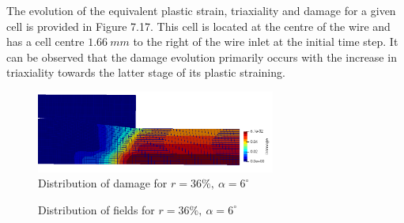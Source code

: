 \documentclass[sn-mathphys,Numbered,draft]{sn-jnl}%
\begin{document}
The evolution of the equivalent plastic strain, triaxiality and damage for a given cell is provided in Figure 7.17. This cell is located at the centre of the wire and has a cell centre $1.66\ mm$ to the right of the wire inlet at the initial time step. It can be observed that the damage evolution primarily occurs with the increase in triaxiality towards the latter stage of its plastic straining.

\begin{figure}[htb]
\begin{center}
	\includegraphics[width=0.7\textwidth]{./Figures/SimulationAndAnalysis/compare36_12/36_6Damage.png}
\caption{Distribution of damage for $r=36\%,\ \alpha=6^{\circ}$}
\label{fig:notchedRoundBAr}
\end{center}
\end{figure}

\begin{figure}[t!]
	\centering
	  \qquad
        \qquad
		
		\caption{Distribution of fields for $r=36\%,\ \alpha=6^{\circ}$}
	\label{label_for_entire_figure}
\end{figure}
\end{document}
